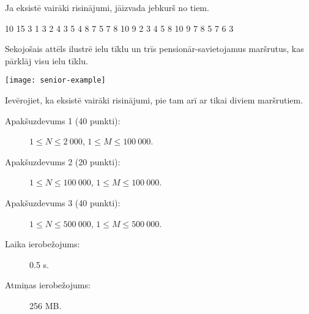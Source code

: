 \documentclass{boi2014-lv}
\begin{document}
		Ja eksistē vairāki risinājumi, jāizvada jebkurš no tiem.

    \Example

    \example
    {
        10 15  3  1 3  2 4  3 5  4 8  7  5 7  8  10  9
    }
    {
        2 3 4 5 8 10 9  7 8  5 7 6 3
    }
    {
        Sekojošais attēls ilustrē ielu tīklu un trīs pensionār-savietojamus maršrutus, kas pārklāj visu ielu tīklu.

        \texttt{[image: senior-example]}

				Ievērojiet, ka eksistē vairāki risinājumi, pie tam arī ar tikai diviem maršrutiem.
    
    }

    \Scoring

    \begin{description}
        \item[Apakšuzdevums 1 (40 punkti):] $1 \le N \le 2\ 000$, $1 \le M \le 100\ 000$.
        \item[Apakšuzdevums 2 (20 punkti):] $1 \le N \le 100\ 000$, $1 \le M \le 100\ 000$.
        \item[Apakšuzdevums 3 (40 punkti):] $1 \le N \le 500\ 000$, $1 \le M \le 500\ 000$.
    \end{description}

    \Constraints

    \begin{description}
        \item[Laika ierobežojums:] 0.5 s.
        \item[Atmiņas ierobežojums:] 256 MB.
    \end{description}
\end{document}

